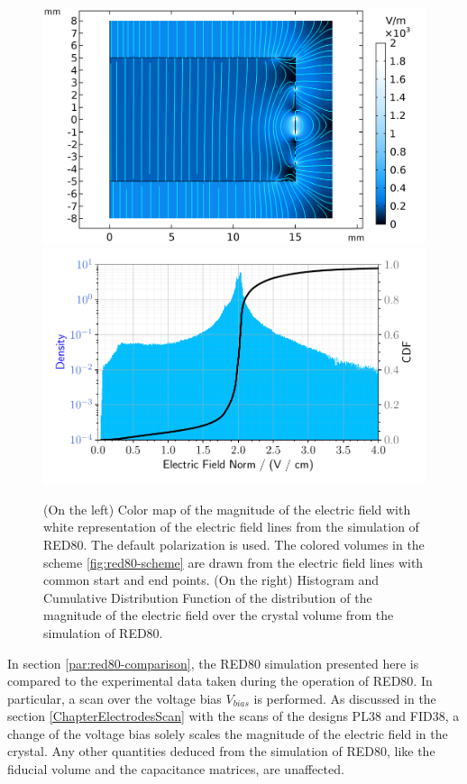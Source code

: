 \begin{figure}
\centering
\includegraphics[align=c, scale=0.5]{Figures/ElectrodesExperimental/efield_red80.png}
\includegraphics[align=c, scale=0.5]{Figures/ElectrodesExperimental/enorm_hist_red80.pdf}
\caption{(On the left) Color map of the magnitude of the electric field with white representation of the electric field lines from the simulation of RED80. The default polarization is used. The colored volumes in the scheme \ref{fig:red80-scheme} are drawn from the electric field lines with common start and end points.
(On the right) Histogram and Cumulative Distribution Function of the distribution of the magnitude of the electric field over the crystal volume from the simulation of RED80.}
\label{fig:red80-efield}
\end{figure}

In section \ref{par:red80-comparison}, the RED80 simulation presented here is compared to the experimental data taken during the operation of RED80. In particular, a scan over the voltage bias $V_{bias}$ is performed. As discussed in the section \ref{ChapterElectrodesScan} with the scans of the designs PL38 and FID38, a change of the voltage bias solely scales the magnitude of the electric field in the crystal. Any other quantities deduced from the simulation of RED80, like the fiducial volume and the capacitance matrices, are unaffected.


